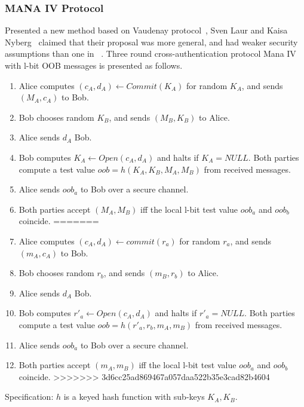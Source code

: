 \subsubsection*{MANA IV Protocol}

Presented a new method based on Vaudenay protocol~\cite{Vaudenay:2005qa}, Sven Laur and Kaisa Nyberg~\cite{Laur:2006kl} claimed that their proposal was more general, and had weaker security assumptions than one in ~\cite{Pasini:2006fu}. Three round cross-authentication protocol Mana IV with l-bit OOB messages is presented as follows. 

\begin{enumerate}
<<<<<<< HEAD
\item Alice computes $(c_A,d_A) \leftarrow Commit(K_A)$ for random $K_A$, and sends $(M_A,c_A)$ to Bob.
\item Bob chooses random $K_B$, and sends $(M_B,K_B)$ to Alice.
\item Alice sends $d_A$ Bob.
\item Bob computes $K_A \leftarrow Open(c_A,d_A)$ and halts if $K_A = NULL$. Both parties compute a test value $oob = h(K_A,K_B,M_A,M_B)$ from received messages.
\item Alice sends $oob_a$ to Bob over a secure channel. 
\item Both parties accept $(M_A,M_B)$ iff the local l-bit test value $oob_a$ and $oob_b$ coincide. 
=======
\item Alice computes $(c_A,d_A) \leftarrow commit(r_a)$ for random $r_a$, and sends $(m_A,c_A)$ to Bob.
\item Bob chooses random $r_b$, and sends $(m_B,r_b)$ to Alice.
\item Alice sends $d_A$ Bob.
\item Bob computes $r'_a \leftarrow Open(c_A,d_A)$ and halts if $r'_a= NULL$. Both parties compute a test value $oob = h(r'_a,r_b,m_A,m_B)$ from received messages.
\item Alice sends $oob_a$ to Bob over a secure channel. 
\item Both parties accept $(m_A,m_B)$ iff the local l-bit test value $oob_a$ and $oob_b$ coincide. 
>>>>>>> 3d6cc25ad869467a057daa522b35e3cad82b4604
\end{enumerate}

Specification: $h$ is a keyed hash function with sub-keys $K_A, K_B$.

